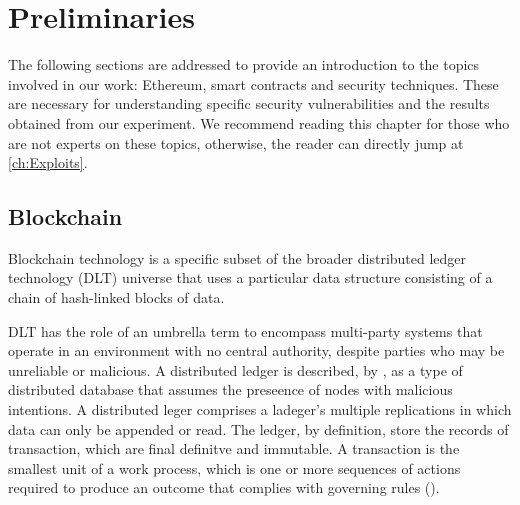 

\lstset{style=mystyle}
\chapter{Preliminaries}
\label{ch:Backgroud}

The following sections are addressed to provide an introduction to the topics involved in our work: Ethereum, smart contracts and security techniques.
These are necessary for understanding specific security vulnerabilities and the results obtained from our experiment.
We recommend reading this chapter for those who are not experts on these topics, otherwise, the reader can directly jump at \autoref{ch:Exploits}.

\section{Blockchain}
\label{sec:Backgroud:Bitcoin}
Blockchain technology is a specific subset of the broader distributed ledger technology (DLT) universe that uses a 
particular data structure consisting of a chain of hash-linked blocks of data.

DLT has the role of an umbrella term to encompass multi-party 
systems that operate in an environment with no central authority, despite parties who may be 
unreliable or malicious. 
A distributed ledger is described, by \citet{DLT}, as a type of distributed database that assumes the preseence of nodes with malicious intentions. 
A distributed leger comprises a ladeger's multiple replications in which data can only be appended or read. 
The ledger, by definition, store the records of transaction, which are final definitve and immutable. 
A transaction is the smallest unit of a work process, which is one or more sequences of actions required to produce an outcome that complies with governing rules (\cite{Ledger}).

